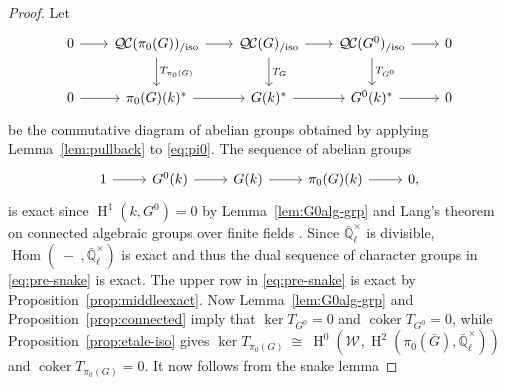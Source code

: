\documentclass[CM,Submssn,SecEq]{degruyter-crelle} %
\theoremstyle{plain}
\theoremstyle{definition}
\theoremstyle{remark}
\newcommand{\EE}{\mathbb{\bar Q}_\ell}
\newcommand{\Fq}{k}
\newcommand{\EEx}{\EE^\times}
\newcommand{\Weil}[1]{\mathcal{W}_{#1}}
\DeclareMathOperator{\Hom}{Hom}
\DeclareMathOperator{\coker}{coker}
\DeclareMathOperator{\Hh}{H}
\newcommand{\iso}{{\ \cong\ }}
\newcommand{\TrFrob}[1]{T_{#1}}
\newcommand{\QC}{{\mathcal{Q\hskip-0.8pt C}}}
\newcommand{\QCiso}[1]{\QC(#1)_{/\text{iso}}}
\begin{document}
\begin{proof}
  Let
  \begin{equation}\label{eq:pre-snake}
  \begin{tikzcd}[row sep=20, column sep=20]
    0 \rar & \QCiso{\pi_0(G)} \rar \dar{\TrFrob{\pi_0(G)}}
    & \QCiso{G} \rar \dar{\TrFrob{G}} & \QCiso{G^0} \rar \dar{\TrFrob{G^0}} & 0\\
    0 \rar & \pi_0(G)(\Fq)^* \rar
    &  G(\Fq)^* \rar & G^0(\Fq)^* \rar & 0
  \end{tikzcd}
  \end{equation}
  be the commutative diagram of abelian groups obtained by applying
  Lemma~\ref{lem:pullback} to \eqref{eq:pi0}.
  The sequence of abelian groups
\[
  \begin{tikzcd}
    1 \rar & G^0(\Fq) \rar & G(\Fq) \rar & \pi_0(G)(\Fq) \rar & 0,
  \end{tikzcd}
\]
  is exact since $\Hh^1(\Fq,G^0) =0$ by Lemma~\ref{lem:G0alg-grp} and Lang's theorem on connected algebraic groups over finite fields \cite{lang:56a}.
  Since $\EEx$ is divisible, $\Hom(\ - \ ,\EEx)$ is exact and thus the dual sequence of
  character groups in \eqref{eq:pre-snake} is exact.
%
  The upper row in \eqref{eq:pre-snake} is exact by Proposition~\ref{prop:middleexact}.
  Now Lemma~\ref{lem:G0alg-grp} and Proposition~\ref{prop:connected}
  imply that $\ker \TrFrob{G^0} =0$ and $\coker \TrFrob{G^0}=0$,
  while Proposition~\ref{prop:etale-iso} gives $\ker \TrFrob{\pi_0(G)} \iso \Hh^0(\Weil{},\Hh^2(\pi_0({\bar G}),\EEx))$
  and $\coker \TrFrob{\pi_0(G)}=0$.
It now follows from the snake lemma 

\end{proof}
\end{document}
